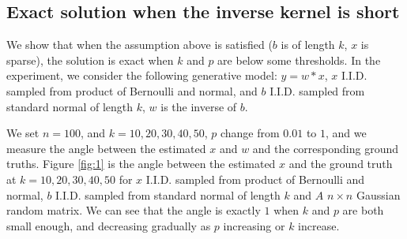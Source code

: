 \documentclass[letter, 10pt]{article}
\numberwithin{equation}{section}
\begin{document}
\subsection{Exact solution when the inverse kernel is short}
We show that when the assumption above is satisfied ($b$ is of length $k$, $x$ is sparse), the solution is exact when $k$ and $p$ are below some thresholds.
In the experiment, we consider the following generative model: $y = w * x$,  $x$ I.I.D. sampled from product of Bernoulli and normal, and $b$ I.I.D. sampled from standard normal of length $k$, $w$ is the inverse of $b$.

We set $n=100$, and $k= 10, 20, 30, 40, 50$, $p$ change from $0.01$ to $1$, and we measure the angle between the estimated $x$ and $w$ and the corresponding ground truths. Figure \ref{fig:1} is the angle between the estimated $x$ and the ground truth at $k=10, 20, 30, 40, 50$ for $x$ I.I.D. sampled from product of Bernoulli and normal, $b$ I.I.D. sampled from standard normal of length $k$ and $A$ $n\times n$ Gaussian random matrix.
We can see that the angle is exactly $1$ when $k$ and $p$ are both small enough, and decreasing gradually as $p$ increasing or $k$ increase. 


\end{document}

